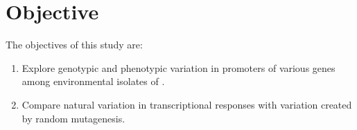 \chapter*{Objective}

The objectives of this study are:

\begin{enumerate}
\item Explore genotypic and phenotypic variation in promoters of various genes among environmental isolates of .

\item Compare natural variation in transcriptional responses with variation created by random mutagenesis.

\end{enumerate}



\shorthandon{-} 
